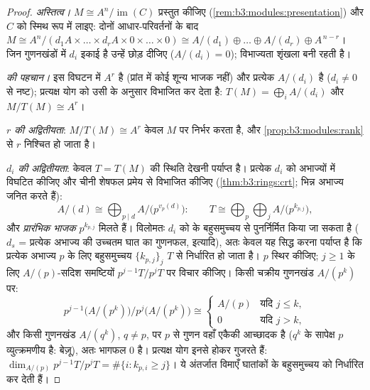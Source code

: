 \begin{proof}
\emph{अस्तित्व।} $M \cong A^n/\operatorname{im}(C)$ प्रस्तुत कीजिए (\cref{rem:b3:modules:presentation}) और $C$ को स्मिथ
रूप में लाइए: दोनों आधार-परिवर्तनों के बाद $M \cong A^n / (d_1A \times \dots
\times d_rA \times 0 \times \dots \times 0) \cong A/(d_1) \oplus
\dots \oplus A/(d_r) \oplus A^{\,n - r}$। जिन गुणनखंडों
में $d_i$ इकाई है उन्हें छोड़ दीजिए ($A/(d_i) = 0$); विभाज्यता शृंखला
बनी रहती है।

\emph{ की पहचान।} इस विघटन में $A^r$  है (प्रांत
में कोई शून्य भाजक नहीं) और प्रत्येक $A/(d_i)$  है ($d_i \ne 0$ से
नष्ट); प्रत्यक्ष योग  को उसी के अनुसार विभाजित कर देता है:
$T(M) = \bigoplus_i A/(d_i)$ और $M/T(M) \cong A^r$।

\emph{$r$ की अद्वितीयता}: $M/T(M) \cong A^r$ केवल $M$ पर निर्भर करता है,
और \cref{prop:b3:modules:rank} से $r$ निश्चित हो जाता है।

\emph{$d_i$ की अद्वितीयता}: केवल  $T = T(M)$ की स्थिति
देखनी पर्याप्त है। प्रत्येक $d_i$ को अभाज्यों में विघटित कीजिए
और चीनी शेषफल प्रमेय से विभाजित कीजिए (\cref{thm:b3:rings:crt}; भिन्न अभाज्य
 जनित करते हैं):
\[
A/(d) \cong \bigoplus_{p \mid d} A/\bigl(p^{v_p(d)}\bigr):
\qquad
T \cong \bigoplus_{p} \bigoplus_{j} A/\bigl(p^{k_{p,j}}\bigr),
\]
और \emph{प्रारंभिक भाजक} $p^{k_{p,j}}$ मिलते हैं।
विलोमतः $d_i$ को  के बहुसमुच्चय से पुनर्निर्मित
किया जा सकता है ($d_s$ = प्रत्येक अभाज्य की उच्चतम घात का
गुणनफल, इत्यादि), अतः केवल यह सिद्ध करना पर्याप्त है कि प्रत्येक
अभाज्य $p$ के लिए बहुसमुच्चय $\{k_{p,j}\}_j$ $T$ से निर्धारित हो जाता
है। $p$ स्थिर कीजिए; $j \geq 1$ के लिए $A/(p)$-सदिश समष्टियों $p^{j-1}T/p^jT$
पर विचार कीजिए। किसी चक्रीय गुणनखंड $A/(p^k)$ पर:
\[
p^{j-1}\bigl(A/(p^k)\bigr)\big/p^{j}\bigl(A/(p^k)\bigr)
\cong
\begin{cases}
A/(p) & \text{यदि } j \leq k,\\
0 & \text{यदि } j > k,
\end{cases}
\]
और किसी गुणनखंड $A/(q^k)$, $q \neq p$, पर $p$ से गुणन वहाँ एकैकी आच्छादक
है ($q^k$ के सापेक्ष $p$ व्युत्क्रमणीय है: बेज़ू), अतः भागफल
$0$ है। प्रत्यक्ष योग इनसे होकर गुजरते हैं: $\dim_{A/(p)}
p^{j-1}T/p^jT = \#\{i : k_{p,i} \geq j\}$। ये
अंतर्जात विमाएँ घातांकों के बहुसमुच्चय को निर्धारित कर देती हैं।
\end{proof}

